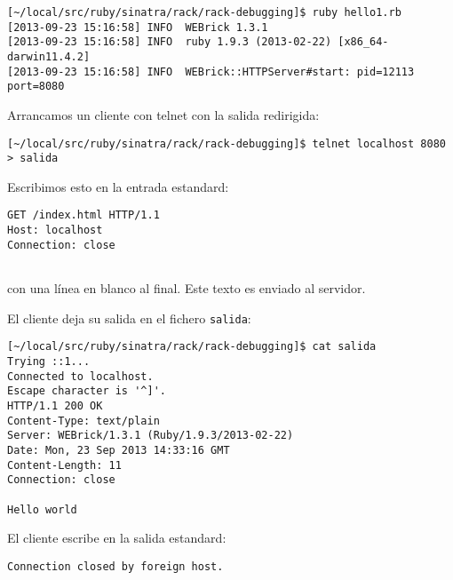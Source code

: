 \begin{verbatim}
[~/local/src/ruby/sinatra/rack/rack-debugging]$ ruby hello1.rb 
[2013-09-23 15:16:58] INFO  WEBrick 1.3.1
[2013-09-23 15:16:58] INFO  ruby 1.9.3 (2013-02-22) [x86_64-darwin11.4.2]
[2013-09-23 15:16:58] INFO  WEBrick::HTTPServer#start: pid=12113 port=8080

\end{verbatim}

Arrancamos un cliente con telnet con la salida redirigida:
\begin{verbatim}
[~/local/src/ruby/sinatra/rack/rack-debugging]$ telnet localhost 8080 > salida
\end{verbatim}

Escribimos esto en la entrada estandard:
\begin{verbatim}
GET /index.html HTTP/1.1
Host: localhost
Connection: close


\end{verbatim}
con una línea en blanco al final.
Este texto es enviado al servidor.

El cliente deja su salida en el fichero \verb|salida|:
\begin{verbatim}
[~/local/src/ruby/sinatra/rack/rack-debugging]$ cat salida
Trying ::1...
Connected to localhost.
Escape character is '^]'.
HTTP/1.1 200 OK 
Content-Type: text/plain
Server: WEBrick/1.3.1 (Ruby/1.9.3/2013-02-22)
Date: Mon, 23 Sep 2013 14:33:16 GMT
Content-Length: 11
Connection: close

Hello world
\end{verbatim}
El cliente escribe en la salida estandard:
\begin{verbatim}
Connection closed by foreign host.
\end{verbatim}

